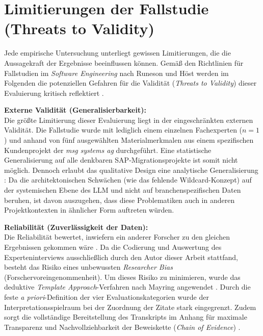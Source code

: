 \section{Limitierungen der Fallstudie (Threats to Validity)}
\label{subsec:limitierungen_evaluation}

Jede empirische Untersuchung unterliegt gewissen Limitierungen, die die Aussagekraft der Ergebnisse beeinflussen können. Gemäß den Richtlinien für Fallstudien im \textit{Software Engineering} nach Runeson und Höst werden im Folgenden die potenziellen Gefahren für die Validität (\textit{Threats to Validity}) dieser Evaluierung kritisch reflektiert \parencite{runesonGuidelinesConductingReporting2009}.

\textbf{Externe Validität (Generalisierbarkeit):} \\
Die größte Limitierung dieser Evaluierung liegt in der eingeschränkten externen Validität. Die Fallstudie wurde mit lediglich einem einzelnen Fachexperten ($n=1$) und anhand von fünf ausgewählten Materialmerkmalen aus einem spezifischen Kundenprojekt der \textit{msg systems ag} durchgeführt. Eine statistische Generalisierung auf alle denkbaren SAP-Migrationsprojekte ist somit nicht möglich. Dennoch erlaubt das qualitative Design eine analytische Generalisierung \textcite{runesonGuidelinesConductingReporting2009}: Da die architektonischen Schwächen (wie das fehlende Wildcard-Konzept) auf der systemischen Ebene des \ac{LLM} und nicht auf branchenspezifischen Daten beruhen, ist davon auszugehen, dass diese Problematiken auch in anderen Projektkontexten in ähnlicher Form auftreten würden. 

\textbf{Reliabilität (Zuverlässigkeit der Daten):} \\
Die Reliabilität bewertet, inwiefern ein anderer Forscher zu den gleichen Ergebnissen gekommen wäre \parencite{runesonGuidelinesConductingReporting2009}. Da die Codierung und Auswertung des Experteninterviews ausschließlich durch den Autor dieser Arbeit stattfand, besteht das Risiko eines unbewussten \textit{Researcher Bias} (Forschervoreingenommenheit). Um dieses Risiko zu minimieren, wurde das deduktive \textit{Template Approach}-Verfahren nach Mayring angewendet \parencite{runesonGuidelinesConductingReporting2009}. Durch die feste \textit{a priori}-Definition der vier Evaluationskategorien wurde der Interpretationsspielraum bei der Zuordnung der Zitate stark eingegrenzt. Zudem sorgt die vollständige Bereitstellung des Transkripts im Anhang für maximale Transparenz und Nachvollziehbarkeit der Beweiskette (\textit{Chain of Evidence}) \parencite{runesonGuidelinesConductingReporting2009}.

